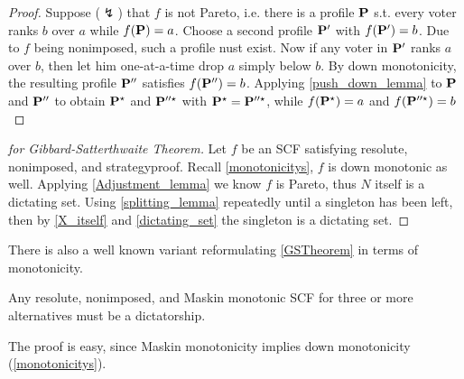\begin{proof}
    Suppose ($\lightning$) that $f$ is not Pareto, i.e. there is a profile $\mathbf{P}$ s.t. every voter ranks $b$ over $a$ while $f(\mathbf{P}) = a$. Choose a second profile $\mathbf{P}'$ with $f(\mathbf{P}') = b$. Due to $f$ being nonimposed, such a profile nust exist. Now if any voter in $\mathbf{P}'$ ranks $a$ over $b$, then let him one-at-a-time drop $a$ simply below $b$. By down monotonicity, the resulting profile $\mathbf{P}''$ satisfies $f(\mathbf{P}'') = b$. Applying \cref{push_down_lemma} to $\mathbf{P}$ and $\mathbf{P}''$ to obtain $\mathbf{P}^\star$ and $\mathbf{P}''^\star$ with $\mathbf{P}^\star = \mathbf{P}''^\star$, while $f(\mathbf{P}^\star) = a$ and $f(\mathbf{P}''^\star) = b$
\end{proof}

\begin{proof}[for Gibbard-Satterthwaite Theorem]
    Let $f$ be an SCF satisfying resolute, nonimposed, and strategyproof. Recall \cref{monotonicitys}, $f$ is down monotonic as well. Applying \cref{Adjustment_lemma} we know $f$ is Pareto, thus $N$ itself is a dictating set. Using \cref{splitting_lemma} repeatedly until a singleton has been left, then by \cref{X_itself} and \cref{dictating_set} the singleton is a dictating set.
\end{proof}

There is also a well known variant reformulating \cref{GSTheorem} in terms of monotonicity.

\begin{theorem}
    Any resolute, nonimposed, and Maskin monotonic SCF for three or more alternatives must be a dictatorship.
\end{theorem}

The proof is easy, since Maskin monotonicity implies down monotonicity (\cref{monotonicitys}).